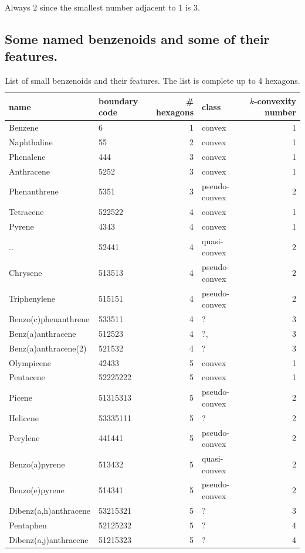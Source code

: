 \documentclass[a4paper,10pt]{article}
\begin{document}
{Always $2$ since the smallest number adjacent to $1$ is $3$.


\subsection{Some named benzenoids and some of their features.}


\begin{table}
 \caption{List of small benzenoids and their features. The list is complete up to 4 hexagons.}
\medskip 
\begin{tabular}{|llrlr|}
  \hline
  name & boundary code & \# hexagons & class & $k$-convexity number\\
  \hline
  Benzene & 6 & 1 & convex & 1\\
  \hline
  Naphthaline & 55 & 2 & convex & 1\\
  \hline
  Phenalene & 444 & 3 & convex & 1\\
  Anthracene & 5252 & 3 & convex & 1\\
  Phenanthrene & 5351 & 3 & pseudo-convex & 2\\
  \hline
  Tetracene & 522522 & 4 & convex & 1\\
  Pyrene & 4343 & 4 & convex & 1\\
  .. & 52441 & 4 & quasi-convex & 2\\
  Chrysene & 513513 & 4 & pseudo-convex & 2\\
  Triphenylene & 515151 & 4 & pseudo-convex & 2\\
  Benzo(c)phenanthrene & 533511 & 4 & ? & 3\\
  Benz(a)anthracene & 512523 & 4 & ?, & 3\\
  Benz(a)anthracene(2) & 521532 & 4 & ? & 3\\
  \hline
  Olympicene & 42433 & 5 & convex & 1\\
  Pentacene & 52225222 & 5 & convex & 1\\
  Picene & 51315313 & 5 & pseudo-convex & 2\\
  Helicene & 53335111 & 5 & ? & 2\\
  Perylene & 441441 & 5 & pseudo-convex & 2\\
  Benzo(a)pyrene & 513432 & 5 & quasi-convex & 2\\
  Benzo(e)pyrene & 514341 & 5 & pseudo-convex & 2\\
  Dibenz(a,h)anthracene & 53215321 & 5 & ? & 3\\
  Pentaphen & 52125232 & 5 & ? & 4\\
  Dibenz(a,j)anthracene & 51215323 & 5 & ? & 4\\

\end{tabular}
\end{table}}
\end{document}
